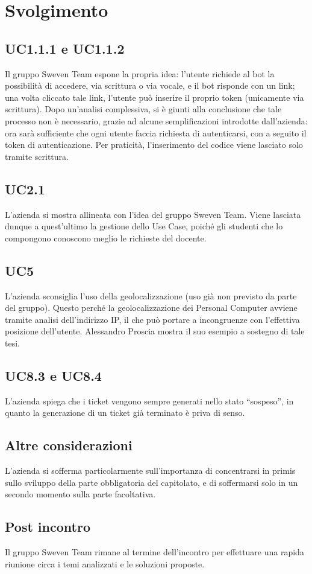 \section{Svolgimento}
\subsection{UC1.1.1 e UC1.1.2}
Il gruppo Sweven Team espone la propria idea: l'utente richiede al bot la possibilità di accedere, via 
scrittura o via vocale, e il bot risponde con un link; una volta cliccato tale link, l'utente può inserire 
il proprio token (unicamente via scrittura). \newline
Dopo un'analisi complessiva, si è giunti alla conclusione che tale processo non è necessario, grazie ad alcune 
semplificazioni introdotte dall'azienda: ora sarà sufficiente che ogni utente faccia richiesta di autenticarsi, 
con a seguito il token di autenticazione. Per praticità, l'inserimento del codice viene lasciato solo tramite 
scrittura.

\subsection{UC2.1}
L'azienda si mostra allineata con l'idea del gruppo Sweven Team. Viene lasciata dunque a quest'ultimo la 
gestione dello Use Case, poiché gli studenti che lo compongono conoscono meglio le richieste del docente.

\subsection{UC5}
L'azienda sconsiglia l'uso della geolocalizzazione (uso già non previsto da parte del gruppo). Questo perché 
la geolocalizzazione dei Personal Computer avviene tramite analisi dell'indirizzo IP, il che può portare a 
incongruenze con l'effettiva posizione dell'utente. Alessandro Proscia mostra il suo esempio a sostegno di tale 
tesi.

\subsection{UC8.3 e UC8.4}
L'azienda spiega che i ticket vengono sempre generati nello stato ``sospeso'', in quanto la generazione di un 
ticket già terminato è priva di senso.

\subsection{Altre considerazioni}
L'azienda si sofferma particolarmente sull'importanza di concentrarsi in primis sullo sviluppo della parte 
obbligatoria del capitolato, e di soffermarsi solo in un secondo momento sulla parte facoltativa.

\subsection{Post incontro}
Il gruppo Sweven Team rimane al termine dell'incontro per effettuare una rapida riunione circa i temi 
analizzati e le soluzioni proposte.

\newpage
